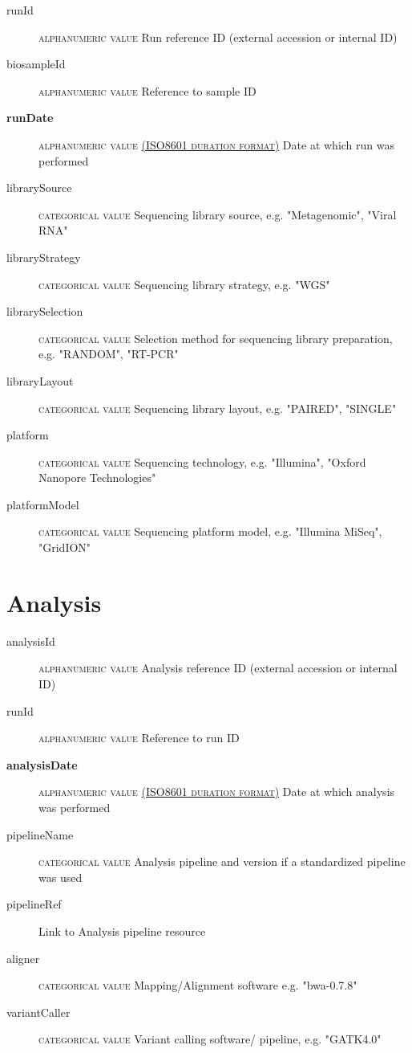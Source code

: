 \documentclass[a4paper, 10pt]{article}        %
\begin{document}
  \begin{description}
	\item[runId] {\textsc{alphanumeric value}} Run reference ID (external accession or internal ID)
	\item[biosampleId] {\textsc{alphanumeric value}}  Reference to sample ID
	\item[\textbf{runDate}] {\textsc{alphanumeric value \href{https://www.iso.org/iso-8601-date-and-time-format.html}{(ISO8601 duration format)}}} Date at which run was performed	
	\item[librarySource] {\textsc{categorical value}}  Sequencing library source, e.g. "Metagenomic", "Viral RNA"
	\item[libraryStrategy]  {\textsc{categorical value}} Sequencing library strategy, e.g. "WGS"
	\item[librarySelection] {\textsc{categorical value}} Selection method for sequencing library preparation, e.g. "RANDOM", "RT-PCR"
	\item[libraryLayout] {\textsc{categorical value}}  Sequencing library layout, e.g. "PAIRED", "SINGLE"
	\item[platform] {\textsc{categorical value}} Sequencing technology, e.g. "Illumina", "Oxford Nanopore Technologies"
	\item[platformModel] {\textsc{categorical value}} Sequencing platform model, e.g. "Illumina MiSeq", "GridION"
 \end{description}
 
 
 
   \section*{ {\color{teal} Analysis}}
  
  \begin{description}
	\item[analysisId] {\textsc{alphanumeric value}} Analysis reference ID (external accession or internal ID)
	\item[runId] {\textsc{alphanumeric value}} Reference to run ID
	\item[\textbf{analysisDate}] {\textsc{alphanumeric value \href{https://www.iso.org/iso-8601-date-and-time-format.html}{(ISO8601 duration format)}}} Date at which analysis was performed  
	\item[pipelineName]  {\textsc{categorical value}} Analysis pipeline and version if a standardized pipeline was used
	\item[pipelineRef]  Link to Analysis pipeline resource
	\item[aligner]  {\textsc{categorical value}} Mapping/Alignment software e.g. "bwa-0.7.8"
	  \item[variantCaller]  {\textsc{categorical value}} Variant calling software/ pipeline, e.g. "GATK4.0" %
 \end{description}
 
\end{document}
